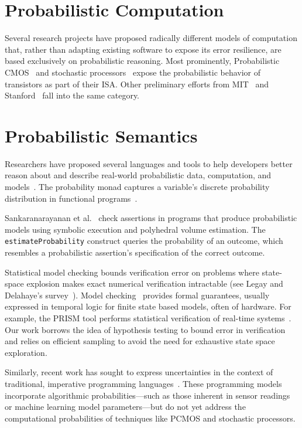 \section{Probabilistic Computation}

Several research projects have proposed radically different models of
computation that, rather than adapting existing software to expose its error
resilience, are based exclusively on probabilistic reasoning. Most
prominently, Probabilistic CMOS~\cite{pcmos, pcmos-cacm, palem-dac-position}
and stochastic processors~\cite{stochasticproc} expose the probabilistic
behavior of transistors as part of their ISA.
Other preliminary efforts from MIT~\cite{batesmit, lyric, mansinghka-circuits} and
Stanford~\cite{ersa} fall into the same category.

\section{Probabilistic Semantics}

Researchers have proposed several languages and tools to
help developers better reason about and describe real-world
probabilistic data, computation, and models~\cite{BBGR13,
  wingate-lightweight, church, chaganty, pfeffersample, pmonad,
  infernet, probdsl,uncertaint}.
The probability monad captures a variable's discrete probability
distribution in functional programs~\cite{pmonad}.

Sankaranarayanan et al.~\cite{sriram-pldi} check assertions in
programs that produce probabilistic models using symbolic execution
and polyhedral volume estimation. The \texttt{estimateProbability} construct
queries the probability of an outcome, which resembles a probabilistic
assertion's
specification of the correct outcome.

Statistical model checking bounds verification error on 
problems where state-space explosion makes exact numerical
verification intractable (see Legay and Delahaye's
survey~\cite{legay10}).  Model checking~\cite{Clarke} provides formal guarantees,
usually expressed in temporal logic for finite state
based models, often of hardware. For example, the
PRISM tool performs statistical verification of real-time
systems~\cite{KNP11}. Our work borrows the idea of hypothesis
testing to bound error in verification~\cite{Younes,Younes20061368}
and
relies on efficient sampling to avoid
the need for exhaustive state space exploration.

Similarly, recent work has sought to express
uncertainties in the context of traditional, imperative programming
languages~\cite{uncertaint}. These programming models incorporate algorithmic
probabilities---such as those inherent in sensor readings or machine learning
model parameters---but do not yet address the computational probabilities of
techniques like PCMOS and stochastic processors.


